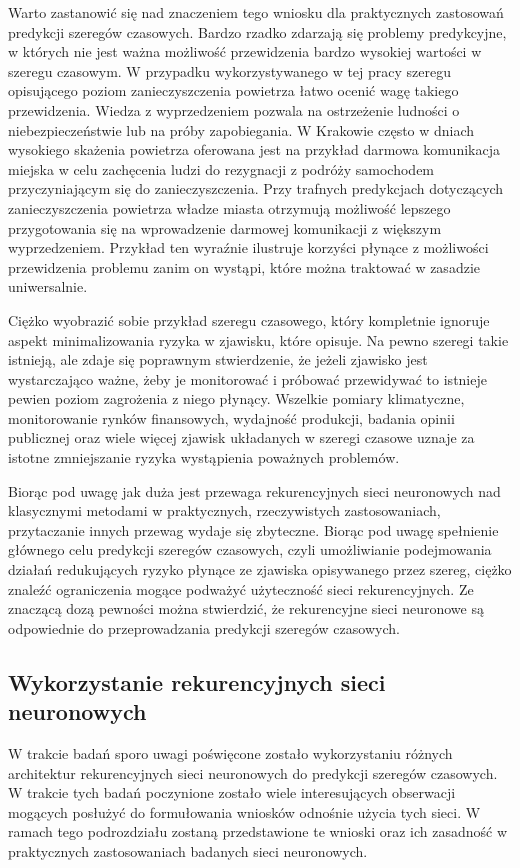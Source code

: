\documentclass[10pt,a4paper]{article}
\begin{document}
Warto zastanowić się nad znaczeniem tego wniosku dla praktycznych zastosowań predykcji szeregów czasowych. Bardzo rzadko zdarzają się problemy predykcyjne, w których nie jest ważna możliwość przewidzenia bardzo wysokiej wartości w szeregu czasowym. W przypadku wykorzystywanego w tej pracy szeregu opisującego poziom zanieczyszczenia powietrza łatwo ocenić wagę takiego przewidzenia. Wiedza z wyprzedzeniem pozwala na ostrzeżenie ludności o niebezpieczeństwie lub na próby zapobiegania. W Krakowie często w dniach wysokiego skażenia powietrza oferowana jest na przykład darmowa komunikacja miejska \cite{krkFreeMPK} w celu zachęcenia ludzi do rezygnacji z podróży samochodem przyczyniającym się do zanieczyszczenia. Przy trafnych predykcjach dotyczących zanieczyszczenia powietrza władze miasta otrzymują możliwość lepszego przygotowania się na wprowadzenie darmowej komunikacji z większym wyprzedzeniem. Przykład ten wyraźnie ilustruje korzyści płynące z możliwości przewidzenia problemu zanim on wystąpi, które można traktować w zasadzie uniwersalnie. 

Ciężko wyobrazić sobie przykład szeregu czasowego, który kompletnie ignoruje aspekt minimalizowania ryzyka w zjawisku, które opisuje. Na pewno szeregi takie istnieją, ale zdaje się poprawnym stwierdzenie, że jeżeli zjawisko jest wystarczająco ważne, żeby je monitorować i próbować przewidywać to istnieje pewien poziom zagrożenia z niego płynący. Wszelkie pomiary klimatyczne, monitorowanie rynków finansowych, wydajność produkcji, badania opinii publicznej oraz wiele więcej zjawisk układanych w szeregi czasowe uznaje za istotne zmniejszanie ryzyka wystąpienia poważnych problemów. 

Biorąc pod uwagę jak duża jest przewaga rekurencyjnych sieci neuronowych nad klasycznymi metodami w praktycznych, rzeczywistych zastosowaniach, przytaczanie innych przewag wydaje się zbyteczne. Biorąc pod uwagę spełnienie głównego celu predykcji szeregów czasowych, czyli umożliwianie podejmowania działań redukujących ryzyko płynące ze zjawiska opisywanego przez szereg, ciężko znaleźć ograniczenia mogące podważyć użyteczność sieci rekurencyjnych. Ze znaczącą dozą pewności można stwierdzić, że rekurencyjne sieci neuronowe są odpowiednie do przeprowadzania predykcji szeregów czasowych.

\subsection{Wykorzystanie rekurencyjnych sieci neuronowych}
W trakcie badań sporo uwagi poświęcone zostało wykorzystaniu różnych architektur rekurencyjnych sieci neuronowych do predykcji szeregów czasowych. W trakcie tych badań poczynione zostało wiele interesujących obserwacji mogących posłużyć do formułowania wniosków odnośnie użycia tych sieci. W ramach tego podrozdziału zostaną przedstawione te wnioski oraz ich zasadność w praktycznych zastosowaniach badanych sieci neuronowych. 
\end{document}
